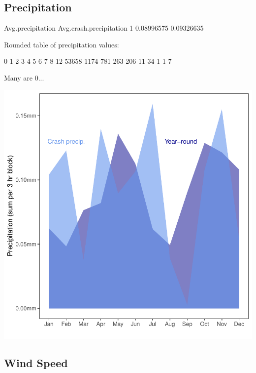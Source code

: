 \documentclass[11pt, a4paper]{article}
\begin{document}
\pagebreak
\subsection{Precipitation}

\begin{Schunk}
\begin{Soutput}
  Avg.precipitation Avg.crash.precipitation
1        0.08996575              0.09326635
\end{Soutput}
\begin{Soutput}
Rounded table of precipitation values:
\end{Soutput}
\begin{Soutput}
    0     1     2     3     4     5     6     7     8    12 
53658  1174   781   263   206    11    34     1     1     7 
\end{Soutput}
\begin{Soutput}
Many are 0...
\end{Soutput}
\end{Schunk}
\includegraphics{variableinvestigation-012}


\pagebreak
\subsection{Wind Speed}
\end{document}
